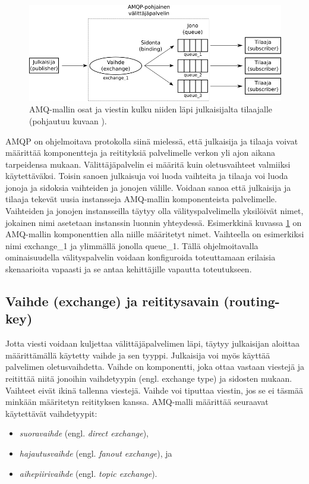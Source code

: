 \begin{figure}[ht!]
	\includegraphics[width=1\textwidth]{pictures/amq-model-parts.png}
	\caption{AMQ-mallin osat ja viestin kulku niiden läpi julkaisijalta tilaajalle (pohjautuu kuvaan \mbox{\cite[s.~11]{AMQP-specification}}).}
	\label{fig:amq-model-parts}
\end{figure}

AMQP on ohjelmoitava protokolla siinä mielessä, että julkaisija ja tilaaja voivat määrittää komponentteja ja reitityksiä palvelimelle verkon yli ajon aikana tarpeidensa mukaan. Välittäjäpalvelin ei määritä kuin oletusvaihteet valmiiksi käytettäväksi. Toisin sanoen julkaisuja voi luoda vaihteita ja tilaaja voi luoda jonoja ja sidoksia vaihteiden ja jonojen välille. Voidaan sanoa että julkaisija ja tilaaja tekevät uusia instansseja AMQ-mallin komponenteista palvelimelle. Vaihteiden ja jonojen instansseilla täytyy olla välityspalvelimella yksilöivät nimet, jokainen nimi asetetaan instanssin luonnin yhteydessä. Esimerkkinä kuvassa \ref{fig:amq-model-parts} on AMQ-mallin komponenttien alla niille määritetyt nimet. Vaihteella on esimerkiksi nimi exchange\_1 ja ylimmällä jonolla queue\_1. Tällä ohjelmoitavalla ominaisuudella välityspalvelin voidaan konfiguroida toteuttamaan erilaisia skenaarioita vapaasti ja se antaa kehittäjille vapautta toteutukseen.


\subsection{Vaihde (exchange) ja reititysavain (routing-key)}
Jotta viesti voidaan kuljettaa välittäjäpalvelimen läpi, täytyy julkaisijan aloittaa määrittämällä käytetty vaihde ja sen tyyppi. Julkaisija voi myös käyttää palvelimen oletusvaihdetta. Vaihde on komponentti, joka ottaa vastaan viestejä ja reitittää niitä jonoihin vaihdetyypin (engl. exchange type) ja sidosten mukaan. Vaihteet eivät ikinä tallenna viestejä. Vaihde voi tiputtaa viestin, jos se ei täsmää minkään määritetyn reitityksen kanssa. AMQ-malli määrittää seuraavat käytettävät vaihdetyypit:
\begin{itemize}
	\item \emph{suoravaihde} (engl. \emph{direct exchange}),
	\item \emph{hajautusvaihde} (engl. \emph{fanout exchange}), ja
	\item \emph{aihepiirivaihde} (engl. \emph{topic exchange}).
\end{itemize}

